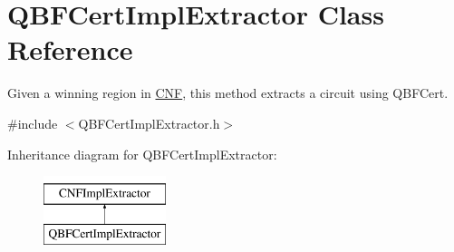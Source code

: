 \hypertarget{classQBFCertImplExtractor}{\section{Q\-B\-F\-Cert\-Impl\-Extractor Class Reference}
\label{classQBFCertImplExtractor}
}


Given a winning region in \hyperlink{classCNF}{C\-N\-F}, this method extracts a circuit using Q\-B\-F\-Cert.  




{\ttfamily \#include $<$Q\-B\-F\-Cert\-Impl\-Extractor.\-h$>$}

Inheritance diagram for Q\-B\-F\-Cert\-Impl\-Extractor\-:\begin{figure}[H]
\begin{center}
\leavevmode
\includegraphics[height=2.000000cm]{classQBFCertImplExtractor}
\end{center}
\end{figure}
